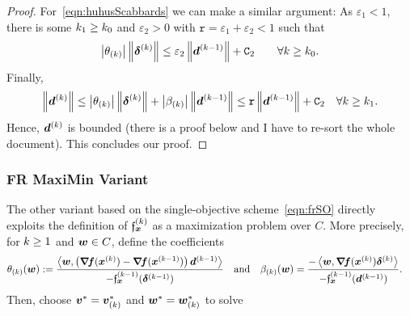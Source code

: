 \documentclass{article}
\theoremstyle{plain}
\theoremstyle{definition}
\begin{document}
\begin{proof}
	For~\eqref{eqn:huhusScabbards} we can make a similar argument:
	As $\varepsilon_1 < 1$, there is some $k_1 \geq k_0$ and 
	$\varepsilon_2>0$ with 
	$\mathtt r = \varepsilon_1 + \varepsilon_2 < 1$
	such that 
	$$
	\left|\theta_{(k)}\right|
		\left\|\bm{\delta}^{(k)}\right\|
	\leq
	\varepsilon_2 \left\|\bm{d}^{(k-1)}\right\| + \mathtt C_2
	\qquad\forall k\geq k_0.
	$$
	Finally,
	$$
	\left\|\bm{d}^{(k)}\right\|
	\leq 
	\left|\theta_{(k)}\right|
	\left\|\bm{\delta}^{(k)}\right\|
	+
	\left|\beta_{(k)}\right|\left\|\bm{d}^{(k-1)}\right\|
	\leq
	\mathtt r \left\|\bm{d}^{(k-1)}\right\|
	+ \mathtt C_2
	\quad \forall k \geq k_1.
	$$
	Hence, $\bm{d}^{(k)}$ is bounded (there is a proof below and I have to re-sort the whole document).
	This concludes our proof.
\end{proof}

\bgroup\color{lightgray}
\subsubsection*{FR MaxiMin Variant}
The other variant based on the single-objective 
scheme~\eqref{eqn:frSO} directly exploits
the definition of $\mathfrak{f}_{\bm{x}}^{(k)}$ as a maximization problem
over $C$.
More precisely, for $k \ge 1$ and $\bm{w}\in C$,
define the coefficients
\begin{equation}
	\begin{aligned}
	\theta_{(k)}(\bm{w})
	&:=
	\frac{
		\left\langle \bm{w}, 
			\left(\bm{\nabla}\!\bm{f}(\bm{x}^{(k)}) - \bm{\nabla}\!\bm{f}(\bm{x}^{(k-1)})\right)\bm{d}^{(k-1)} \right\rangle
	}{
		-\mathfrak{f}_{\bm{x}}^{(k-1)}(\bm{\delta}^{(k-1)})
	}
	\quad\text{and}\quad
	\beta_{(k)}(\bm{w})
	=
	\frac{-\left\langle \bm{w}, \bm{\nabla}\!\bm{f}(\bm{x}^{(k)})\bm{\delta}^{(k)} \right\rangle}{-\mathfrak{f}_{\bm{x}}^{(k-1)}(\bm{d}^{(k-1)})}
	.
	\end{aligned}
	\label{eqn:characteriserAbout}
\end{equation}
Then, choose $\bm{v}^* = \bm{v}_{(k)}^*$ 
and $\bm{w}^* = \bm{w}_{(k)}^*$ to solve
\end{document}
